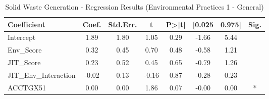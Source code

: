 \begin{table}[htbp]
    \centering
    \caption{Solid Waste Generation - Regression Results (Environmental Practices 1 - General)}
    \label{tab:regression}
    \begin{tabular}{lccccccc}
\toprule
Coefficient & Coef. & Std.Err. & t & P>|t| & [0.025 & 0.975] & Sig. \\
\midrule
Intercept & 1.89 & 1.80 & 1.05 & 0.29 & -1.66 & 5.44 &  \\
Env\_Score & 0.32 & 0.45 & 0.70 & 0.48 & -0.58 & 1.21 &  \\
JIT\_Score & 0.23 & 0.52 & 0.45 & 0.65 & -0.79 & 1.26 &  \\
JIT\_Env\_Interaction & -0.02 & 0.13 & -0.16 & 0.87 & -0.28 & 0.23 &  \\
ACCTGX51 & 0.00 & 0.00 & 1.86 & 0.07 & -0.00 & 0.00 & * \\
\bottomrule
\end{tabular}

    \end{table}
    